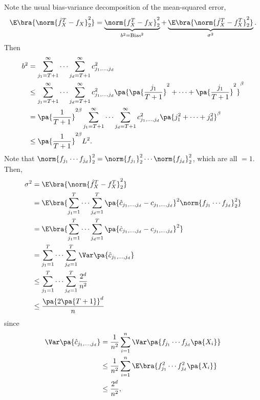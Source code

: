 Note the usual bias-variance decomposition of the mean-squared error,
\begin{equation*}
  \E\bra{\norm{\hat f_X^T - f_X}^2_2} = \underbrace{\norm{f_X^T - f_X }^2_2}_{b^2=\text{Bias}^2} + \underbrace{\E\bra{\norm{\hat{f}_X^T - f_X^T}_2^2}}_{\sigma^2}.
\end{equation*}
Then
\begin{equation*}
\begin{split}
  b^2 &= \sum_{j_1 = T+1}^\infty \cdots \sum_{j_d = T+1}^\infty c^2_{j_1,\ldots, j_d} \\
  &\leq \sum_{j_1 = T+1}^\infty \cdots \sum_{j_d = T+1}^\infty c^2_{j_1,\ldots, j_d} \pa{\pa{\frac{j_1}{T+1}}^2 + \cdots + \pa{\frac{j_1}{T+1}}^2}^\beta \\
  &= \pa{\frac{1}{T+1}}^{2\beta } \sum_{j_1 = T+1}^\infty \cdots \sum_{j_d = T+1}^\infty c^2_{j_1,\ldots, j_d} \pa{j_1^2 + \cdots + j_d^2}^\beta \\
  &\leq \pa{\frac{1}{T+1}}^{2\beta} L^2.
\end{split}
\end{equation*}
Note that $\norm{f_{j_1}\cdots f_{j_d}}_2^2 = \norm{f_{j_1}}_2^2 \cdots \norm{f_{j_d}}_2^2$, which are all $=1$. Then,
\begin{equation*}
\begin{split}
  \sigma^2 &= \E\bra{ \norm{\hat{f}_X^T - f_X^T}_2^2}\\
   &= \E\bra{\sum_{j_1=1}^T \cdots \sum_{j_d=1}^T \pa{\hat{c}_{j_1,\ldots,j_d} - c_{j_1,\ldots, j_d}}^2\norm{f_{j_1}\cdots f_{j_d}}^2_2 }\\
   &= \E\bra{\sum_{j_1=1}^T \cdots \sum_{j_d=1}^T \pa{\hat{c}_{j_1,\ldots,j_d} - c_{j_1,\ldots, j_d}}^2} \\
  &= \sum_{j_1=1}^T \cdots \sum_{j_d=1}^T \Var\pa{\hat c_{j_1,...,j_d}}   \\
  &\leq \sum_{j_1=1}^T \cdots \sum_{j_d=1}^T \frac{2^d}{n^2}\\
  &\leq \frac{\pa{2 \pa{T+1} }^d }{n}
\end{split}
\end{equation*}
since
\begin{equation*}
\begin{split}
  \Var\pa{\hat c_{j_1,...,j_d}} &= \frac{1}{n^2} \sum_{i=1}^n \Var \pa{f_{j_1} \cdots f_{j_d} \pa{X_i}} \\
  &\leq \frac{1}{n^2} \sum_{i=1}^n \E \bra{f_{j_1}^2 \cdots f_{j_d}^2 \pa{X_i}}\\
  &\leq \frac{2^d}{n^2},
  \end{split}
\end{equation*}
